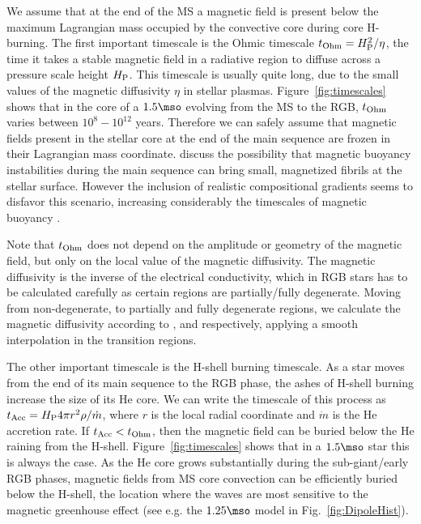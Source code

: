 We assume that at the end of the MS a magnetic field is present below the maximum Lagrangian mass occupied by the convective core during core H-burning.
The first important timescale is the Ohmic timescale $t_{\rm Ohm}= H_{\rm P}^2/\eta$, the time it takes a stable magnetic field in a radiative region to diffuse across a pressure scale height $H_{\rm P}$. This timescale is usually quite long, due to the small values of the magnetic diffusivity $\eta$ in stellar plasmas. Figure~\ref{fig:timescales} shows that in the core of a $1.5\mso$ evolving from the MS to the RGB, $t_{\rm Ohm}$ varies between $10^8-10^{12}$ years. Therefore we can safely assume that magnetic fields present in the stellar core at the end of the main sequence are frozen in their Lagrangian mass coordinate.
\citet{MacGregor_2003} discuss the possibility that magnetic buoyancy instabilities during the main sequence can bring small, magnetized fibrils at the stellar surface. However the inclusion of realistic compositional gradients seems to disfavor this scenario, increasing considerably the timescales of magnetic buoyancy \citep{MacDonald_2004}.

Note that  $t_{\rm Ohm}$ does not depend on the amplitude or geometry of the magnetic field, but only on the local value of the magnetic diffusivity. The magnetic diffusivity is the inverse of the electrical conductivity,  which in RGB stars has to be calculated carefully as certain regions are partially/fully degenerate. Moving from non-degenerate, to partially and fully degenerate regions, we calculate the magnetic diffusivity according to \cite{1968dms..book.....S}, \cite{1987ApJ...313..284W} and \cite{1984MNRAS.209..511N} respectively, applying a smooth interpolation in the transition regions.

The other important timescale is the H-shell burning timescale. As a star moves from the end of its main sequence to the RGB phase, the ashes of H-shell burning increase the size of its He core. We can write the timescale of this process as $t_{\rm Acc} = H_{\rm P} 4\pi r^2 \rho / \dot{m}$, where $r$ is the local radial coordinate and $\dot{m}$ is the He accretion rate. If $t_{\rm Acc} < t_{\rm Ohm}$, then the magnetic field can be buried below the He raining from the H-shell. Figure~\ref{fig:timescales} shows that in a $1.5\mso$ star this is always the case. As the He core grows substantially during the sub-giant/early RGB phases, magnetic fields from MS core convection can be efficiently buried below the H-shell, the location where the waves are most sensitive to the magnetic greenhouse effect (see e.g. the $1.25\mso$ model in Fig.~\ref{fig:DipoleHist}).


